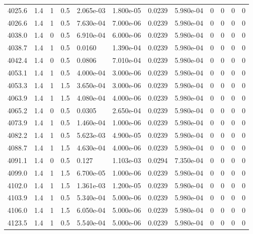 \documentclass[preview]{standalone}
\begin{document}
{{{{{{{{{{{{{{{{\begin{tabular}{L{1.2cm}C{1.2cm} C{0.3cm}C{0.5cm} C{1.4cm}C{1.4cm} C{1.4cm}C{1.4cm} C{1.6cm}C{1.6cm} C{1.6cm}C{1.6cm}}
  4025.6  &   1.4  & 1     & 0.5 &  2.065e-03  & 1.800e-05  &  0.0239&   5.980e-04& 0 & 0   &  0 & 0  \\ 
  4026.6  &   1.4  & 1     & 0.5 &  7.630e-04  & 7.000e-06  &  0.0239&   5.980e-04& 0 & 0   &  0 & 0  \\ 
  4038.0  &   1.4  & 0     & 0.5 &  6.910e-04  & 6.000e-06  &  0.0239&   5.980e-04& 0 & 0   &  0 & 0  \\ 
  4038.7  &   1.4  & 1     & 0.5 &  0.0160  & 1.390e-04  &  0.0239&   5.980e-04& 0 & 0   &  0 & 0  \\ 
  4042.4  &   1.4  & 0     & 0.5 &  0.0806  & 7.010e-04  &  0.0239&   5.980e-04& 0 & 0   &  0 & 0  \\ 
  4053.1  &   1.4  & 1     & 0.5 &  4.000e-04  & 3.000e-06  &  0.0239&   5.980e-04& 0 & 0   &  0 & 0  \\ 
  4053.3  &   1.4  & 1     & 1.5 &  3.650e-04  & 3.000e-06  &  0.0239&   5.980e-04& 0 & 0   &  0 & 0  \\ 
  4063.9  &   1.4  & 1     & 1.5 &  4.080e-04  & 4.000e-06  &  0.0239&   5.980e-04& 0 & 0   &  0 & 0  \\ 
  4065.2  &   1.4  & 0     & 0.5 &  0.0305  & 2.650e-04  &  0.0239&   5.980e-04& 0 & 0   &  0 & 0  \\ 
  4073.9  &   1.4  & 1     & 0.5 &  1.460e-04  & 1.000e-06  &  0.0239&   5.980e-04& 0 & 0   &  0 & 0  \\ 
  4082.2  &   1.4  & 1     & 0.5 &  5.623e-03  & 4.900e-05  &  0.0239&   5.980e-04& 0 & 0   &  0 & 0  \\ 
  4088.7  &   1.4  & 1     & 1.5 &  4.630e-04  & 4.000e-06  &  0.0239&   5.980e-04& 0 & 0   &  0 & 0  \\ 
  4091.1  &   1.4  & 0     & 0.5 &  0.127  & 1.103e-03  &  0.0294&   7.350e-04& 0 & 0   &  0 & 0  \\ 
  4099.0  &   1.4  & 1     & 1.5 &  6.700e-05  & 1.000e-06  &  0.0239&   5.980e-04& 0 & 0   &  0 & 0  \\ 
  4102.0  &   1.4  & 1     & 1.5 &  1.361e-03  & 1.200e-05  &  0.0239&   5.980e-04& 0 & 0   &  0 & 0  \\ 
  4103.9  &   1.4  & 1     & 0.5 &  5.340e-04  & 5.000e-06  &  0.0239&   5.980e-04& 0 & 0   &  0 & 0  \\ 
  4106.0  &   1.4  & 1     & 1.5 &  6.050e-04  & 5.000e-06  &  0.0239&   5.980e-04& 0 & 0   &  0 & 0  \\ 
  4123.5  &   1.4  & 1     & 0.5 &  5.540e-04  & 5.000e-06  &  0.0239&   5.980e-04& 0 & 0   &  0 & 0  \\ 

\end{tabular}}}}}}}}}}}}}}}}}
\end{document}
